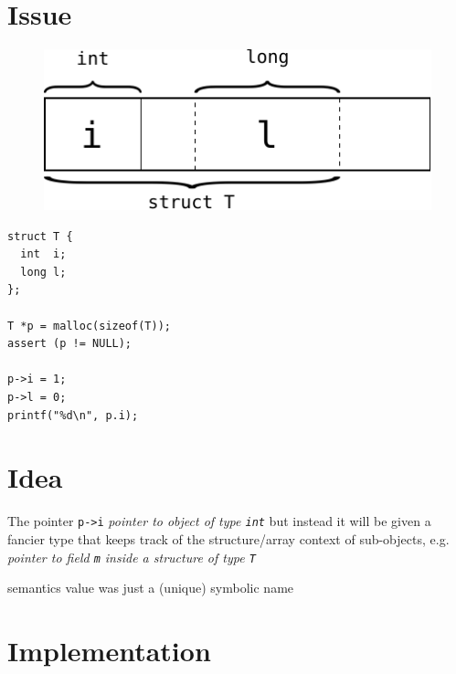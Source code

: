 \documentclass[a4paper,11pt]{article}
\begin{document}
\section{Issue}

\begin{figure}[h]
\includegraphics{pictures/malloc-T}
\centering
\end{figure}


\begin{lstlisting}
struct T {
  int  i;
  long l;
};

T *p = malloc(sizeof(T));
assert (p != NULL);

p->i = 1;
p->l = 0;
printf("%d\n", p.i);
\end{lstlisting}

\section{Idea}
The pointer \lstinline{p->i}  {\em pointer to object of type \lstinline{int}}
but instead it will be given a fancier type that keeps track of the
structure/array context of sub-objects, e.g.   {\em pointer to field \lstinline{m} inside a structure of type \lstinline{T}}

semantics value was just a (unique) symbolic name

\section{Implementation}
\end{document}
